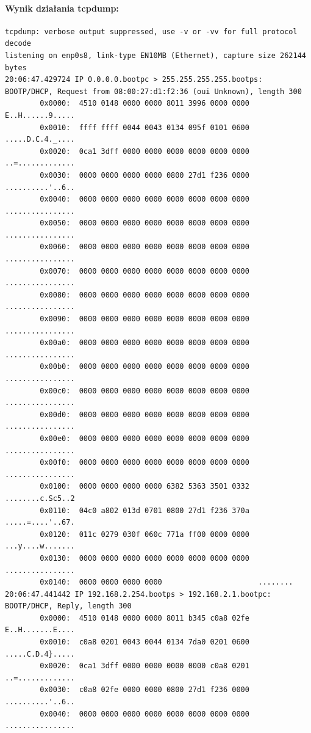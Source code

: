 \documentclass{mwart} %
\begin{document}
\paragraph{Wynik działania tcpdump:}
\begin{footnotesize}
\begin{verbatim}
tcpdump: verbose output suppressed, use -v or -vv for full protocol decode 
listening on enp0s8, link-type EN10MB (Ethernet), capture size 262144 bytes
20:06:47.429724 IP 0.0.0.0.bootpc > 255.255.255.255.bootps: BOOTP/DHCP, Request from 08:00:27:d1:f2:36 (oui Unknown), length 300 
        0x0000:  4510 0148 0000 0000 8011 3996 0000 0000  E..H......9.....
        0x0010:  ffff ffff 0044 0043 0134 095f 0101 0600  .....D.C.4._....
        0x0020:  0ca1 3dff 0000 0000 0000 0000 0000 0000  ..=.............
        0x0030:  0000 0000 0000 0000 0800 27d1 f236 0000  ..........'..6..
        0x0040:  0000 0000 0000 0000 0000 0000 0000 0000  ................
        0x0050:  0000 0000 0000 0000 0000 0000 0000 0000  ................
        0x0060:  0000 0000 0000 0000 0000 0000 0000 0000  ................
        0x0070:  0000 0000 0000 0000 0000 0000 0000 0000  ................
        0x0080:  0000 0000 0000 0000 0000 0000 0000 0000  ................
        0x0090:  0000 0000 0000 0000 0000 0000 0000 0000  ................
        0x00a0:  0000 0000 0000 0000 0000 0000 0000 0000  ................
        0x00b0:  0000 0000 0000 0000 0000 0000 0000 0000  ................
        0x00c0:  0000 0000 0000 0000 0000 0000 0000 0000  ................
        0x00d0:  0000 0000 0000 0000 0000 0000 0000 0000  ................
        0x00e0:  0000 0000 0000 0000 0000 0000 0000 0000  ................
        0x00f0:  0000 0000 0000 0000 0000 0000 0000 0000  ................
        0x0100:  0000 0000 0000 0000 6382 5363 3501 0332  ........c.Sc5..2
        0x0110:  04c0 a802 013d 0701 0800 27d1 f236 370a  .....=....'..67.
        0x0120:  011c 0279 030f 060c 771a ff00 0000 0000  ...y....w.......
        0x0130:  0000 0000 0000 0000 0000 0000 0000 0000  ................
        0x0140:  0000 0000 0000 0000                      ........
20:06:47.441442 IP 192.168.2.254.bootps > 192.168.2.1.bootpc: BOOTP/DHCP, Reply, length 300 
        0x0000:  4510 0148 0000 0000 8011 b345 c0a8 02fe  E..H.......E....
        0x0010:  c0a8 0201 0043 0044 0134 7da0 0201 0600  .....C.D.4}.....
        0x0020:  0ca1 3dff 0000 0000 0000 0000 c0a8 0201  ..=.............
        0x0030:  c0a8 02fe 0000 0000 0800 27d1 f236 0000  ..........'..6..
        0x0040:  0000 0000 0000 0000 0000 0000 0000 0000  ................

\end{verbatim}
\end{footnotesize}
\end{document}
